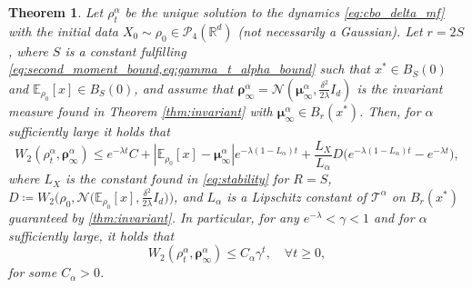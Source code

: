 \documentclass[reqno]{amsart}
\numberwithin{algorithm}{section}
\newcommand{\RR}{\mathbb{R}}
\newcommand{\EE}{{\mathbb E}}
\newcommand{\mc}[1]{\mathcal{#1}}
\newtheorem{theorem}{Theorem}[section]
\begin{document}
{\begin{theorem}\label{thm:globconv_deltaCBO}    Let $\rho_t^\alpha$ be the unique solution to the dynamics \cref{eq:cbo_delta_mf} with the initial data $X_0\sim \rho_0 \in \mathcal{P}_4(\RR^d)$ (not necessarily a Gaussian). {Let $r=2S$}, {where $S$ is a constant fulfilling \cref{eq:second_moment_bound,eq:gamma_t_alpha_bound}} such that $x^* \in B_S(0)$ and $\EE_{\rho_0}[x] \in B_S(0)$, and assume that $\boldsymbol\rho_\infty^\alpha=\mc{N}(\boldsymbol\mu_\infty^\alpha,\frac{\delta^2}{2\lambda}I_d)$ is the invariant measure found in Theorem \ref{thm:invariant} {with $\boldsymbol\mu_\infty^\alpha\in B_r(x^*)$}.
    Then, for $\alpha$ sufficiently large it holds that
\begin{equation}\label{eq:global_conv_deltaCBO_full}
    W_2(\rho_t^\alpha, \boldsymbol\rho_\infty^\alpha)\leq e^{-\lambda t} C + |\EE_{\rho_0}[x] - \boldsymbol\mu_\infty^\alpha| e^{-\lambda (1 - L_\alpha) t} + \frac{L_X}{L_\alpha} D \big(e^{-\lambda (1 - L_\alpha)t} - e^{-\lambda t}\big),
\end{equation}
where $L_X$ is the constant found in \cref{eq:stability} for $R=S$, $D \coloneqq W_2\Big(\rho_0, \mc{N}\big(\EE_{\rho_0}[x],\frac{\delta^2}{2\lambda}I_d\big)\Big)$, and $L_\alpha$ is a Lipschitz constant of $\mc{T}^\alpha$ on $B_r(x^*)$ guaranteed by \cref{thm:invariant}.
In particular, for any $e^{-\lambda} < \gamma < 1$ and for $\alpha$ sufficiently large, it holds that
\begin{equation}\label{eq:global_conv_deltaCBO}
    W_2(\rho_t^\alpha, \boldsymbol\rho_\infty^\alpha) \leq C_\alpha \gamma^t, \quad \forall t \geq 0,
\end{equation}
for some $C_\alpha>0$.
\end{theorem}

}
\end{document}
